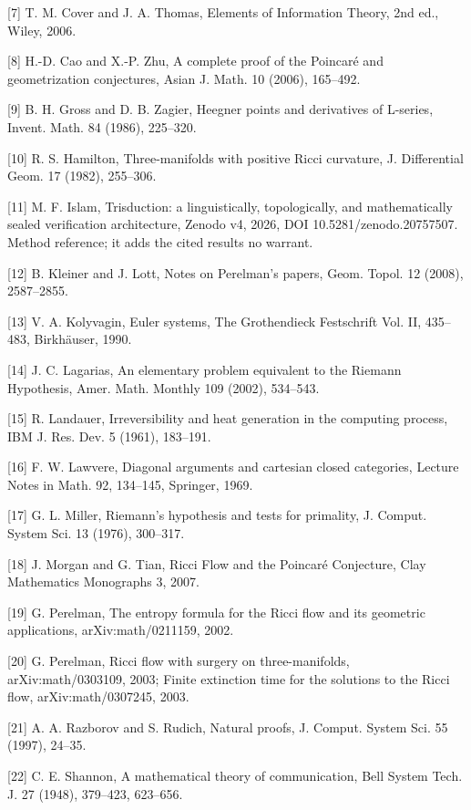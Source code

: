 \documentclass[10pt,twocolumn]{article}
\begin{document}
{[}7{]} T. M. Cover and J. A. Thomas, Elements of Information Theory,
2nd ed., Wiley, 2006.

{[}8{]} H.-D. Cao and X.-P. Zhu, A complete proof of the Poincaré and
geometrization conjectures, Asian J. Math. 10 (2006), 165--492.

{[}9{]} B. H. Gross and D. B. Zagier, Heegner points and derivatives of
L-series, Invent. Math. 84 (1986), 225--320.

{[}10{]} R. S. Hamilton, Three-manifolds with positive Ricci curvature,
J. Differential Geom. 17 (1982), 255--306.

{[}11{]} M. F. Islam, Trisduction: a linguistically, topologically, and
mathematically sealed verification architecture, Zenodo v4, 2026, DOI
10.5281/zenodo.20757507. Method reference; it adds the cited results no
warrant.

{[}12{]} B. Kleiner and J. Lott, Notes on Perelman's papers, Geom.
Topol. 12 (2008), 2587--2855.

{[}13{]} V. A. Kolyvagin, Euler systems, The Grothendieck Festschrift
Vol. II, 435--483, Birkhäuser, 1990.

{[}14{]} J. C. Lagarias, An elementary problem equivalent to the Riemann
Hypothesis, Amer. Math. Monthly 109 (2002), 534--543.

{[}15{]} R. Landauer, Irreversibility and heat generation in the
computing process, IBM J. Res. Dev. 5 (1961), 183--191.

{[}16{]} F. W. Lawvere, Diagonal arguments and cartesian closed
categories, Lecture Notes in Math. 92, 134--145, Springer, 1969.

{[}17{]} G. L. Miller, Riemann's hypothesis and tests for primality, J.
Comput. System Sci. 13 (1976), 300--317.

{[}18{]} J. Morgan and G. Tian, Ricci Flow and the Poincaré Conjecture,
Clay Mathematics Monographs 3, 2007.

{[}19{]} G. Perelman, The entropy formula for the Ricci flow and its
geometric applications, arXiv:math/0211159, 2002.

{[}20{]} G. Perelman, Ricci flow with surgery on three-manifolds,
arXiv:math/0303109, 2003; Finite extinction time for the solutions to
the Ricci flow, arXiv:math/0307245, 2003.

{[}21{]} A. A. Razborov and S. Rudich, Natural proofs, J. Comput. System
Sci. 55 (1997), 24--35.

{[}22{]} C. E. Shannon, A mathematical theory of communication, Bell
System Tech. J. 27 (1948), 379--423, 623--656.
\end{document}
